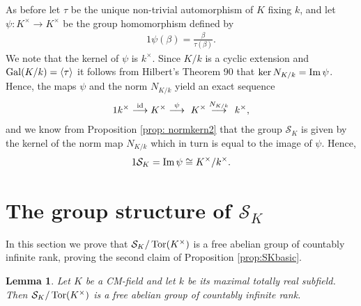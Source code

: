 \documentclass[11pt]{amsart}
\newtheorem{lemma}{Lemma}[section]
\numberwithin{equation}{eqncounter}
\newcommand{\Norm}{N_{K/k}}
\def\id{\mathop{\rm id}\nolimits}
\def\Tor{\mathop{\rm Tor}\nolimits}
\def\Gal{\mathop{\rm Gal}\nolimits}
\def\IM{\mathop{\rm Im}\nolimits}
\def\Sc{\mathcal{S}}
\def\Gal{\mathop{{\rm Gal}}\nolimits}
\begin{document}
As before let $\tau$ be the unique non-trivial automorphism of $K$ fixing $k$, and let
$\psi:K^\times\to K^\times$ be the group homomorphism defined by  
\begin{alignat}1\label{map: psi}
\psi(\beta)=\frac{\beta}{\tau(\beta)}.
\end{alignat}
We note that the kernel of $\psi$ is  $k^\times$. Since $K/k$ is a cyclic extension and $\Gal(K/k)=\langle \tau\rangle$
it follows from Hilbert's Theorem 90 that $\ker \Norm=\IM \psi$. 
Hence, the maps $\psi$ and the norm $N_{K/k}$ yield an exact sequence
\begin{alignat}1\label{exactseq}
k^\times \overset{\id}\longrightarrow K^\times \overset{\psi}{\longrightarrow}\ K^\times \overset{N_{K/k}}{\longrightarrow}\ k^\times,
\end{alignat}
and we know from Proposition \ref{prop: normkern2} that the group $\Sc_K$  is given by  the kernel of the norm map $N_{K/k}$ which in turn is equal to the image of $\psi$. Hence,
\begin{alignat}1\label{eq:SKpsi}
\Sc_K=\IM \psi \cong K^\times/k^\times.
\end{alignat}


\section{The group structure of $\Sc_K$}\label{sec: grpstruc}
In this section we prove that $\Sc_K/\Tor(K^\times)$ is a free abelian group of countably infinite rank,
proving the second claim of Proposition \ref{prop:SKbasic}.

\begin{lemma}\label{lem:infrank}  Let $K$ be a CM-field and let $k$ be its maximal totally real subfield. 
Then $\Sc_K/\Tor(K^{\times})$ is a free abelian group of countably infinite rank.  
\end{lemma}
\end{document}
